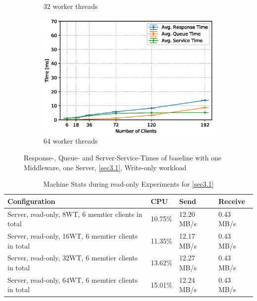 \documentclass[11pt,a4paper]{article}
\begin{document}
\begin{figure}
\begin{subfigure}{.5\textwidth}
        \caption{32 worker threads}
    \end{subfigure}
    \begin{subfigure}{.5\textwidth}
        \includegraphics[width=1\linewidth]{plots/3_1b_extendedLatencyMiddleware_64w.eps}
        \caption{64 worker threads}
    \end{subfigure}

    \caption{Response-, Queue- and Server-Service-Times of baseline with one Middleware, one Server, \autoref{sec3.1}, Write-only workload}
    \label{fig:3-1-times-writeonly}
\end{figure}

\begin{center}
    \begin{table}
    	\begin{tabular}{|l|p{2cm}|p{2cm}|p{2cm}|}
            \hline \textbf{Configuration} & \textbf{CPU} & \textbf{Send} & \textbf{Receive}\\
            \hline Server, read-only, 8WT, 6 memtier clients in total & 10.75\%         & 12.20 MB/s    & 0.43 MB/s\\
            \hline Server, read-only, 16WT, 6 memtier clients in total & 11.35\%         & 12.17 MB/s    & 0.43 MB/s\\
            \hline Server, read-only, 32WT, 6 memtier clients in total & 13.62\%         & 12.27 MB/s    & 0.43 MB/s\\
            \hline Server, read-only, 64WT, 6 memtier clients in total & 15.01\%         & 12.24 MB/s    & 0.43 MB/s\\
            \hline
    	\end{tabular}
	\caption{Machine Stats during read-only Experiments for \autoref{sec3.1}}
    \label{dstat:3-1}
	\end{table}
\end{center}
\end{document}
